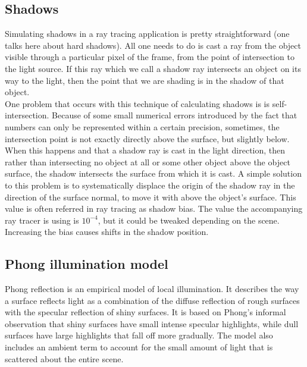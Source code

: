 \documentclass{article}
\begin{document}
\subsection{Shadows}
Simulating shadows in a ray tracing application is pretty straightforward (one talks here about hard shadows). All one needs to do is cast a ray from the object visible through a particular pixel of the frame, from the point of intersection to the light source. If this ray which we call a shadow ray intersects an object on its way to the light, then the point that we are shading is in the shadow of that object.\\
One problem that occurs with this technique of calculating shadows is is self-intersection. Because of some small numerical errors introduced by the fact that numbers can only be represented within a certain precision, sometimes, the intersection point is not exactly directly above the surface, but slightly below. When this happens and that a shadow ray is cast in the light direction, then rather than intersecting no object at all or some other object above the object surface, the shadow intersects the surface from which it is cast. A simple solution to this problem is to systematically displace the origin of the shadow ray in the direction of the surface normal, to move it with above the object's surface. This value is often referred in ray tracing as shadow bias. The value the accompanying ray tracer is using is $10^{-4}$, but it could be tweaked depending on the scene. Increasing the bias causes shifts in the shadow position.

\subsection{Phong illumination model}
Phong reflection is an empirical model of local illumination. It describes the way a surface reflects light as a combination of the diffuse reflection of rough surfaces with the specular reflection of shiny surfaces. It is based on Phong's informal observation that shiny surfaces have small intense specular highlights, while dull surfaces have large highlights that fall off more gradually. The model also includes an ambient term to account for the small amount of light that is scattered about the entire scene. \cite{phong}
\end{document}
